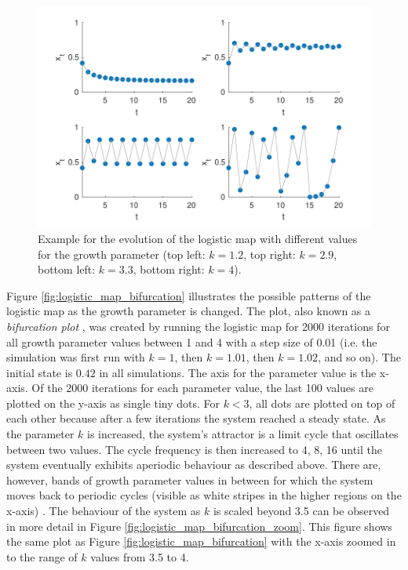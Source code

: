 \begin{figure}[htp]
\begin{center}
\includegraphics[width=\textwidth]{figures/ch3/more_logistic_maps.pdf}
\caption[Example for the evolution of the logistic map with different values for the growth parameter.]{Example for the evolution of the logistic map with different values for the growth parameter (top left: $k = 1.2$, top right: $k = 2.9$, bottom left: $k = 3.3$, bottom right: $k = 4$).}
\label{fig:more_logistic_maps}
\end{center}
\end{figure}

Figure \ref{fig:logistic_map_bifurcation} illustrates the possible patterns of the logistic map as the growth parameter is changed. The plot, also known as a \emph{bifurcation plot} \citep{Feigenbaum1978}, was created by running the logistic map for 2000 iterations for all growth parameter values between 1 and 4 with a step size of 0.01 (i.e. the simulation was first run with $k = 1$, then $k = 1.01$, then $k = 1.02$, and so on). The initial state is $0.42$ in all simulations. The axis for the parameter value is the x-axis. Of the 2000 iterations for each parameter value, the last 100 values are plotted on the y-axis as single tiny dots. For $k < 3$, all dots are plotted on top of each other because after a few iterations the system reached a steady state. As the parameter $k$ is increased, the system’s attractor is a limit cycle that oscillates between two values. The cycle frequency is then increased to 4, 8, 16 until the system eventually exhibits aperiodic behaviour as described above. There are, however, bands of growth parameter values in between for which the system moves back to periodic cycles (visible as white stripes in the higher regions on the x-axis) \citep{KaplanGlass1995, Spivey2007}. The behaviour of the system as $k$ is scaled beyond 3.5 can be observed in more detail in Figure \ref{fig:logistic_map_bifurcation_zoom}. This figure shows the same plot as Figure \ref{fig:logistic_map_bifurcation} with the x-axis zoomed in to the range of $k$ values from 3.5 to 4.

